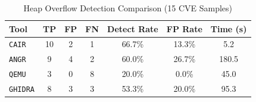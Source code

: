 \begin{table}[t]
\centering
\caption{Heap Overflow Detection Comparison (15 CVE Samples)}
\label{tab:tool_comparison}
\begin{tabular}{lcccccc}
\toprule
Tool & TP & FP & FN & Detect Rate & FP Rate & Time (s) \\
\midrule
\texttt{CAIR} & 10 & 2 & 1 & 66.7\% & 13.3\% & 5.2 \\
\texttt{ANGR} & 9 & 4 & 2 & 60.0\% & 26.7\% & 180.5 \\
\texttt{QEMU} & 3 & 0 & 8 & 20.0\% & 0.0\% & 45.0 \\
\texttt{GHIDRA} & 8 & 3 & 3 & 53.3\% & 20.0\% & 95.3 \\
\bottomrule
\end{tabular}
\end{table}
